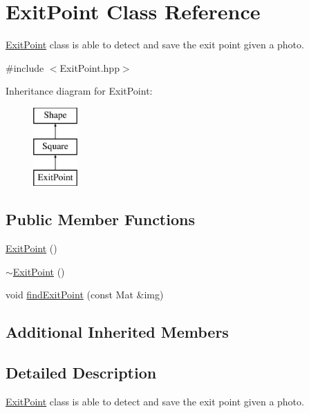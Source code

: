 \hypertarget{class_exit_point}{}\section{Exit\+Point Class Reference}
\label{class_exit_point}


\mbox{\hyperlink{class_exit_point}{Exit\+Point}} class is able to detect and save the exit point given a photo.  




{\ttfamily \#include $<$Exit\+Point.\+hpp$>$}

Inheritance diagram for Exit\+Point\+:\begin{figure}[H]
\begin{center}
\leavevmode
\includegraphics[height=3.000000cm]{class_exit_point}
\end{center}
\end{figure}
\subsection*{Public Member Functions}
\begin{DoxyCompactItemize}
\item 
\mbox{\hyperlink{class_exit_point_ae472f935e952356c9bfe64298474d523}{Exit\+Point}} ()
\item 
\mbox{\hyperlink{class_exit_point_aa764fee5b37cb7dbda6f2fde39ffbc05}{$\sim$\+Exit\+Point}} ()
\item 
void \mbox{\hyperlink{class_exit_point_a2762c0c61bbe71a1a292b86e9517e860}{find\+Exit\+Point}} (const Mat \&img)
\end{DoxyCompactItemize}
\subsection*{Additional Inherited Members}


\subsection{Detailed Description}
\mbox{\hyperlink{class_exit_point}{Exit\+Point}} class is able to detect and save the exit point given a photo. 

